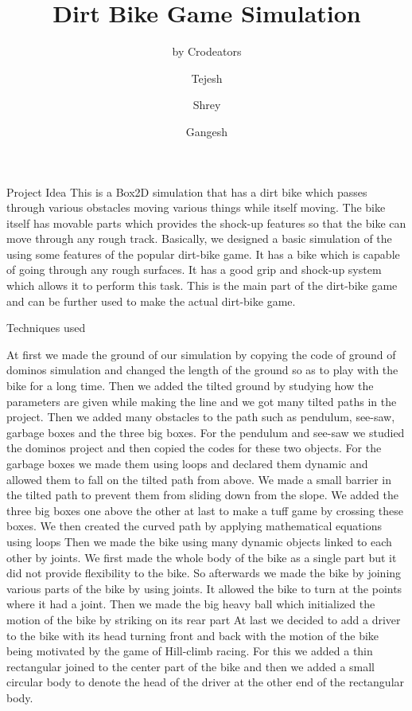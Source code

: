 \documentclass[12pt]{beamer}
\title[Dirt Bike] %
{Dirt Bike Game Simulation}
\subtitle{by Crodeators}
\author[Crodeaters] %
{Tejesh\inst{} \and Shrey\inst{}\and Gangesh\inst{}}
\institute[IITB] %
{
  \inst{}%
  supervised by\\
  Prof. Sharat Chandran\\
  Indian Institute of Techonology 
}
\begin{document}
\begin{frame}
\maketitle
\end{frame}
\begin{frame}{Project Idea}
\color{black}
This is a Box2D simulation that has  a dirt bike which passes through various obstacles moving various things while itself moving.
The bike itself has movable parts which provides the shock-up features so that the bike can move through any rough track.
Basically, we designed a basic simulation of the using some features  of the popular dirt-bike game. It has a bike which is capable of going through any rough surfaces. It has a good grip and shock-up system which allows it to perform this task. This is the main part of the dirt-bike game and can be further used to make the actual dirt-bike game.
\end{frame}
\begin{frame}{Techniques used}

At first we made the ground of our simulation by copying the code of ground of dominos simulation and changed the length of the ground so as to play with the bike for a long time.
\newline
Then we added the tilted ground by studying how the parameters are given while making the line and we got many tilted paths in the project.
\newline
Then we added many obstacles to the path such as pendulum, see-saw, garbage boxes and the three big boxes.
\newline
For the pendulum and see-saw we studied the dominos project and then copied the codes for these two objects.
\newline
For the garbage boxes we made them using loops and declared them dynamic and allowed them to fall on the tilted path from above. We made a small barrier in the tilted path to prevent them from sliding down from the slope.
\newline
We added the three big boxes one above the other at last to make a tuff game by crossing these boxes.
\newline
We then created the curved path by applying mathematical equations using loops
\newline
Then we made the bike using many dynamic objects linked to each other by joints.
We first made the whole body of the bike as a single part but it did not provide flexibility to the bike. So afterwards we made the bike by joining various parts of the bike by using joints. It allowed the bike to turn at the points where it had a joint.
\newline
Then we made the big heavy ball which initialized the motion of the bike by striking on its rear part
\newline
At last we decided to add a driver to the bike with its head turning front and back with the motion of the bike being motivated by the game of Hill-climb racing. For this we added a thin rectangular joined to the center part of the bike and then we added a small circular body to denote the head of the driver at the other end of the rectangular body.
\end{frame}
\end{document}
